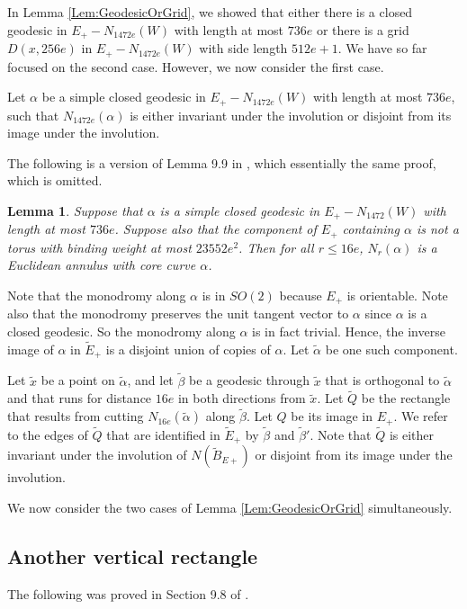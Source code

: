 \documentclass[oneside]{amsart}
\numberwithin{equation}{section}
\theoremstyle{plain}
\newtheorem{lemma}[equation]{Lemma}
\theoremstyle{definition}
\begin{document}
In Lemma \ref{Lem:GeodesicOrGrid}, we showed that either there is a closed geodesic 
in $E_+ - N_{1472e}(W)$ with length at most $736e$ or there is
a grid $D(x, 256e)$ in $E_+ - N_{1472e}(W)$ with side length $512e+1$. We have so far focused on the second case.
However, we now consider the first case. 

Let $\alpha$ be a simple closed geodesic in 
$E_+ - N_{1472e}(W)$ with length at most $736e$, such
that $N_{1472e}(\alpha)$ is either invariant under the involution or disjoint from its image
under the involution.

The following is a version of Lemma 9.9 in \cite{Lackenby:PolyUnknot},
which essentially the same proof, which is omitted.

\begin{lemma} 
Suppose that $\alpha$ is a simple closed
geodesic in $E_+ - N_{1472}(W)$ with length at most $736e$. Suppose also
that the component of $E_+$ containing $\alpha$ is not a torus 
with binding weight at most $23552e^2$. Then for 
all $r \leq 16e$, $N_r(\alpha)$ is a Euclidean annulus
with core curve $\alpha$.
\end{lemma}

Note that the monodromy along $\alpha$ is in $SO(2)$ because $E_+$ is orientable.
Note also that the monodromy preserves the unit tangent vector to $\alpha$ since $\alpha$
is a closed geodesic. So the monodromy along $\alpha$ is in fact trivial. Hence, the inverse
image of $\alpha$ in $\tilde E_+$ is a disjoint union of copies of $\alpha$. Let $\tilde \alpha$
be one such component.

Let $\tilde x$ be a point on $\tilde \alpha$, and let $\tilde \beta$ be a geodesic through $\tilde x$
that is orthogonal to $\tilde \alpha$ and that runs for distance $16e$ in both directions from $\tilde x$.
Let $\tilde Q$ be the rectangle that results from cutting $N_{16e}(\tilde \alpha)$ along
$\tilde \beta$. Let $Q$ be its image in $E_+$. We refer to the edges of $\tilde Q$ that
are identified in $\tilde E_+$ by $\tilde \beta$ and $\tilde \beta'$. Note that $\tilde Q$
is either invariant under the involution of $N(\tilde B_{E+})$ or disjoint from its image under
the involution.

We now consider the two cases of Lemma \ref{Lem:GeodesicOrGrid} simultaneously.

\subsection{Another vertical rectangle}
The following was proved in Section 9.8 of \cite{Lackenby:PolyUnknot}.
\end{document}
